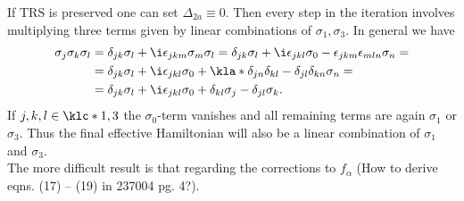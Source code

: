 \documentclass[english, parskip=full]{scrartcl}
\newcommand{\qna}[1]{\color{red}#1\color{black}}
\begin{document}
If TRS is preserved one can set $\Delta_{2a} \equiv 0$.
Then every step in the iteration involves multiplying three terms given by linear combinations of $\sigma_1,\sigma_3$.
In general we have
\begin{align}
\sigma_j\sigma_k\sigma_l &= \delta_{jk} \sigma_l + \i\epsilon_{jkm} \sigma_m\sigma_l = \delta_{jk} \sigma_l + \i \epsilon_{jkl} \sigma_0 - \epsilon_{jkm} \epsilon_{mln} \sigma_n = \\
&= \delta_{jk} \sigma_l + \i \epsilon_{jkl}\sigma_0 + \kla*{\delta_{jn} \delta_{kl} -\delta_{jl} \delta_{kn}} \sigma_n = \\
&= \delta_{jk} \sigma_l + \i \epsilon_{jkl} \sigma_0 + \delta_{kl} \sigma_j - \delta_{jl} \sigma_k.
\end{align}
If $j,k,l\in\klc*{1,3}$ the $\sigma_0$-term vanishes and all remaining terms are again $\sigma_1$ or $\sigma_3$.
Thus the final effective Hamiltonian will also be a linear combination of $\sigma_1$ and $\sigma_3$.\\
The more difficult result is that regarding the corrections to $f_\alpha$ (\qna{How to derive eqns. (17) -- (19) in  237004 pg. 4?}).


\end{document}
